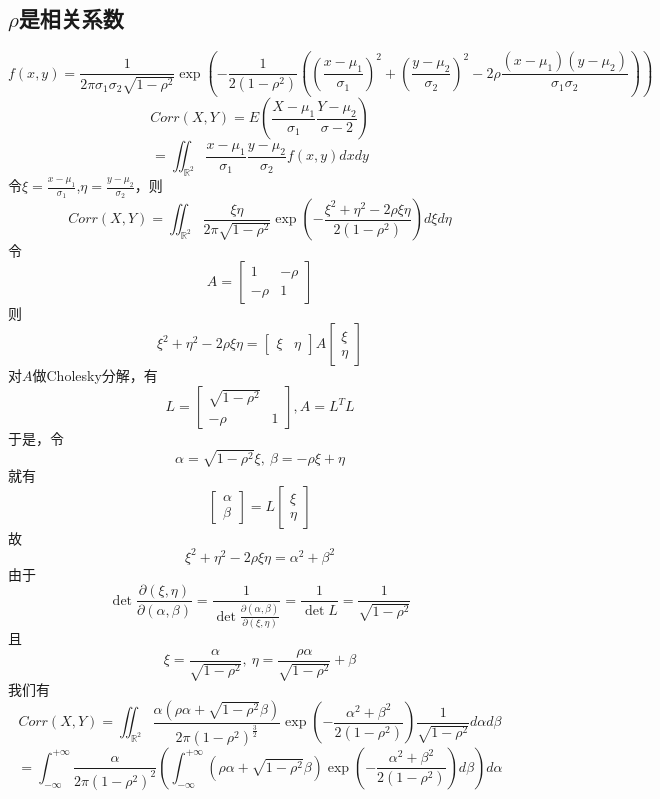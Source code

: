 \documentclass{article}
\begin{document}
\begin{CJK}{UTF8}{gbsn}
\section{$\rho$是相关系数}
$$ f(x,y)=\frac{1}{2\pi\sigma_{1}\sigma_{2}\sqrt{1-\rho^{2}}}\exp{(-\frac{1}{2(1-\rho^{2})}((\frac{x-\mu_{1}}{\sigma_{1}})^{2}+(\frac{y-\mu_{2}}{\sigma_{2}})^{2}-2\rho\frac{(x-\mu_{1})(y-\mu_{2})}{\sigma_{1}\sigma_{2}}))}$$
$$ Corr(X,Y)=E(\frac{X-\mu_{1}}{\sigma_{1}}\frac{Y-\mu_{2}}{\sigma-{2}})$$
$$ =\iint_{\mathbb{R}^{2}}\frac{x-\mu_{1}}{\sigma_{1}}\frac{y-\mu_{2}}{\sigma_{2}}f(x,y)dxdy$$
令$\xi=\frac{x-\mu_{1}}{\sigma_{1}}$,$\eta=\frac{y-\mu_{2}}{\sigma_{2}}$，则
$$ Corr(X,Y)=\iint_{\mathbb{R}^{2}}\frac{\xi\eta}{2\pi\sqrt{1-\rho^{2}}}\exp(-\frac{\xi^{2}+\eta^{2}-2\rho\xi\eta}{2(1-\rho^{2})})d\xi d\eta$$
令
$$ A=\begin{bmatrix}1 & -\rho \\ -\rho & 1\end{bmatrix}$$
则
$$ \xi^{2}+\eta^{2}-2\rho\xi\eta=\begin{bmatrix}\xi & \eta\end{bmatrix}A\begin{bmatrix}\xi \\ \eta \end{bmatrix}$$
对$A$做Cholesky分解，有
$$ L=\begin{bmatrix}\sqrt{1-\rho^{2}}&\\-\rho&1\end{bmatrix},A=L^{T}L$$
于是，令
$$ \alpha=\sqrt{1-\rho^{2}}\xi,\ \beta=-\rho\xi+\eta$$
就有
$$ \begin{bmatrix}\alpha\\\beta\end{bmatrix}=L\begin{bmatrix}\xi\\\eta\end{bmatrix}$$
故
$$ \xi^{2}+\eta^{2}-2\rho\xi\eta=\alpha^{2}+\beta^{2}$$
由于
$$ \det\frac{\partial(\xi,\eta)}{\partial(\alpha,\beta)}=\frac{1}{\det\frac{\partial(\alpha,\beta)}{\partial(\xi,\eta)}}=\frac{1}{\det L}=\frac{1}{\sqrt{1-\rho^{2}}}$$
且
$$ \xi=\frac{\alpha}{\sqrt{1-\rho^{2}}},\ \eta=\frac{\rho\alpha}{\sqrt{1-\rho^{2}}}+\beta$$
我们有
$$ Corr(X,Y)=\iint_{\mathbb{R}^{2}}\frac{\alpha(\rho\alpha+\sqrt{1-\rho^{2}}\beta)}{2\pi(1-\rho^{2})^\frac{3}{2}}\exp(-\frac{\alpha^{2}+\beta^{2}}{2(1-\rho^{2})})\frac{1}{\sqrt{1-\rho^{2}}}d\alpha d\beta$$
$$ =\int_{-\infty}^{+\infty}\frac{\alpha}{2\pi(1-\rho^{2})^{2}}(\int_{-\infty}^{+\infty}(\rho\alpha+\sqrt{1-\rho^{2}}\beta)\exp(-\frac{\alpha^{2}+\beta^{2}}{2(1-\rho^{2})})d\beta)d\alpha$$

\end{CJK}
\end{document}
